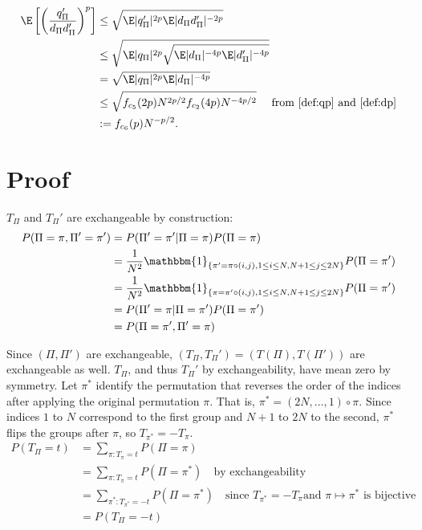 \begin{align}
  \E \left [ \left ( \frac{q_{\Pi}'}{d_{\Pi}d_{\Pi}'} \right )^p \right ]
  &\leq \sqrt{\E |q_{\Pi}'|^{2p} \E |d_{\Pi}d_{\Pi}'|^{-2p}} \nonumber \\
  &\leq \sqrt{\E |q_{\Pi}|^{2p} \sqrt{\E |d_{\Pi}|^{-4p} \E |d_{\Pi}'|^{-4p}}} \nonumber \\
  &= \sqrt{\E |q_{\Pi}|^{2p} \E |d_{\Pi}|^{-4p}} \nonumber \\
  &\leq \sqrt{f_{c_5}(2p) N^{2p/2} f_{c_2}(4p) N^{-4p/2}} \quad \text{ from
  } \eqref{def:qp} \text{ and } \eqref{def:dp} \nonumber \\
  &:= f_{c_6}(p) N^{-p/2} \label{def:qpddp}.
\end{align}

\section{Proof}
$T_{\Pi}$ and $T_{\Pi}'$ are exchangeable by construction:
\begin{align*}
  P(\Pi = \pi, \Pi' = \pi') &= P(\Pi' = \pi' | \Pi = \pi)P(\Pi = \pi) \\
  &= \frac{1}{N^2}\mathbbm{1}_{\{\pi'=\pi \circ (i,j), 1\leq i \leq N, N+1 \leq j \leq 2N\}} P(\Pi =
  \pi') \\
  &=\frac{1}{N^2}\mathbbm{1}_{\{\pi=\pi' \circ (i,j), 1\leq i \leq N, N+1 \leq j \leq 2N\}} P(\Pi =
  \pi') \\
  &= P(\Pi' = \pi | \Pi = \pi')P(\Pi = \pi') \\
  &= P(\Pi = \pi', \Pi' = \pi)
\end{align*}

Since $(\Pi, \Pi')$ are exchangeable, $(T_{\Pi}, T_{\Pi}') = (T(\Pi), T(\Pi'))$ are exchangeable as
well.  $T_{\Pi}$, and thus $T_{\Pi}'$ by exchangeability, have mean zero by symmetry.  Let $\pi^*$ identify
the permutation that reverses the order of the indices after applying the original permutation
$\pi$.  That is, $\pi^* = (2N, \ldots, 1) \circ \pi$.  Since indices $1$ to $N$ correspond to the
first group and $N+1$ to $2N$ to the second, $\pi^*$ flips the groups after $\pi$, so $T_{\pi^*} =
-T_{\pi}$.
\begin{align*}
  P(T_{\Pi} = t) &= \sum_{\pi : T_{\pi} = t} P(\Pi = \pi) \\
  &= \sum_{\pi : T_{\pi} = t} P(\Pi = \pi^*) \quad \text{by exchangeability} \\
  &= \sum_{\pi^* : T_{\pi^*} = -t} P(\Pi = \pi^*) \quad \text{since } T_{\pi^*} = -T_{\pi} \text{
    and } \pi \mapsto \pi^* \text{ is bijective} \\
  &= P(T_{\Pi} = -t)
\end{align*}

